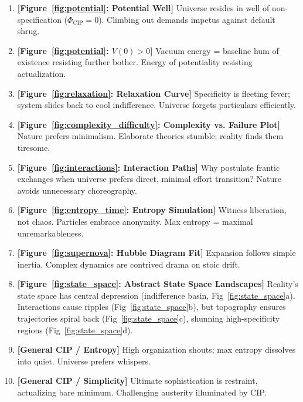 \documentclass[11pt, a4paper]{article}
\newcommand{\subt}[1]{\mathrm{#1}}
\begin{document}
\begin{enumerate}
    \item \textbf{[Figure~\ref{fig:potential}: Potential Well]} Universe resides in well of non-specification ($\Phi_{\subt{CIP}}=0$). Climbing out demands impetus against default shrug.
    \item \textbf{[Figure~\ref{fig:potential}: $V(0) > 0$]} Vacuum energy = baseline hum of existence resisting further bother. Energy of potentiality resisting actualization.
    \item \textbf{[Figure~\ref{fig:relaxation}: Relaxation Curve]} Specificity is fleeting fever; system slides back to cool indifference. Universe forgets particulars efficiently.
    \item \textbf{[Figure~\ref{fig:complexity_difficulty}: Complexity vs. Failure Plot]} Nature prefers minimalism. Elaborate theories stumble; reality finds them tiresome.
    \item \textbf{[Figure~\ref{fig:interactions}: Interaction Paths]} Why postulate frantic exchanges when universe prefers direct, minimal effort transition? Nature avoids unnecessary choreography.
    \item \textbf{[Figure~\ref{fig:entropy_time}: Entropy Simulation]} Witness liberation, not chaos. Particles embrace anonymity. Max entropy = maximal unremarkableness.
    \item \textbf{[Figure~\ref{fig:supernova}: Hubble Diagram Fit]} Expansion follows simple inertia. Complex dynamics are contrived drama on stoic drift.
    \item \textbf{[Figure~\ref{fig:state_space}: Abstract State Space Landscapes]} Reality's state space has central depression (indifference basin, Fig~\ref{fig:state_space}a). Interactions cause ripples (Fig~\ref{fig:state_space}b), but topography ensures trajectories spiral back (Fig~\ref{fig:state_space}c), shunning high-specificity regions (Fig~\ref{fig:state_space}d).
    \item \textbf{[General CIP / Entropy]} High organization shouts; max entropy dissolves into quiet. Universe prefers whispers.
    \item \textbf{[General CIP / Simplicity]} Ultimate sophistication is restraint, actualizing bare minimum. Challenging austerity illuminated by CIP.
\end{enumerate}
\end{document}
